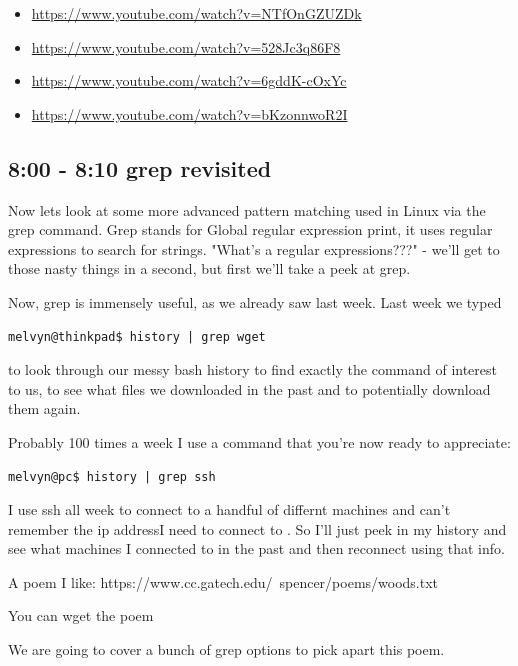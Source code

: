 \documentclass[10pt]{article}
\begin{document}
\begin{itemize}
\item \url{https://www.youtube.com/watch?v=NTfOnGZUZDk}
\item \url{https://www.youtube.com/watch?v=528Jc3q86F8}
\item \url{https://www.youtube.com/watch?v=6gddK-cOxYc}
\item \url{https://www.youtube.com/watch?v=bKzonnwoR2I}
\end{itemize}

\subsection{8:00 - 8:10 grep revisited}
Now lets look at some more advanced pattern matching used in Linux via the grep command. 
Grep stands for Global regular expression print, it uses regular expressions to search for strings. "What's a regular expressions???" - we'll get to those nasty things in a second, but first we'll take a peek at grep.

Now, grep is immensely useful, as we already saw last week. Last week we typed

\begin{lstlisting}[style=term]
melvyn@thinkpad$ history | grep wget
\end{lstlisting}

to look through our messy bash history to find exactly the command of interest to us, to see what files we downloaded in the past and to potentially download them again.

Probably  100 times a week I use a command that you're now ready to appreciate:

\begin{lstlisting}
melvyn@pc$ history | grep ssh
\end{lstlisting}

I use ssh all week to connect to a handful of differnt machines and can't
remember the ip addressI need to connect to . So I'll just peek in my history
and see what machines I connected to in the past and then reconnect using that
info.

A poem I like:
https://www.cc.gatech.edu/~spencer/poems/woods.txt

You can wget the poem

We are going to cover a bunch of grep options to pick apart this poem.
\end{document}
